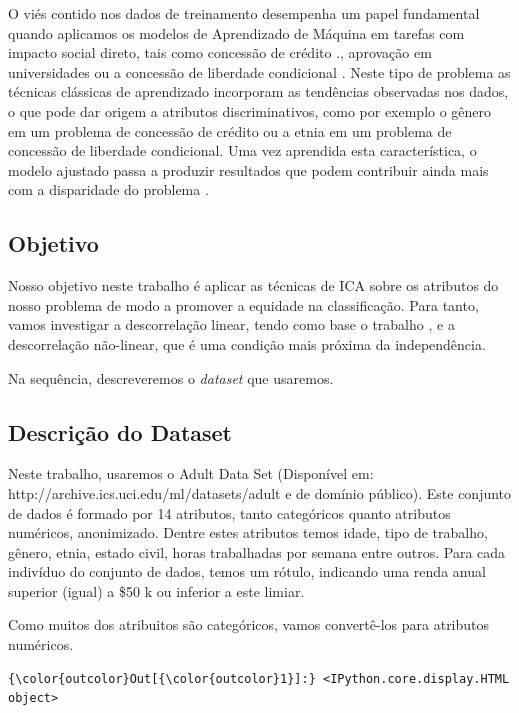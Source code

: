 \documentclass[11pt]{article}
\begin{document}
O viés contido nos dados de treinamento desempenha um papel fundamental
quando aplicamos os modelos de Aprendizado de Máquina em tarefas com
impacto social direto, tais como concessão de crédito \cite{ONeil2016}.,
aprovação em universidades \cite{ONeil2016} ou a concessão de liberdade
condicional \cite{Chouldechova2017}. Neste tipo de problema as técnicas
clássicas de aprendizado incorporam as tendências observadas nos dados,
o que pode dar origem a atributos discriminativos, como por exemplo o
gênero em um problema de concessão de crédito ou a etnia em um problema
de concessão de liberdade condicional. Uma vez aprendida esta
característica, o modelo ajustado passa a produzir resultados que podem
contribuir ainda mais com a disparidade do problema \cite{ONeil2016}.

    \subsection{Objetivo}\label{objetivo}

Nosso objetivo neste trabalho é aplicar as técnicas de ICA
\cite{Hyvarinen2001} sobre os atributos do nosso problema de modo a
promover a equidade na classificação. Para tanto, vamos investigar a
descorrelação linear, tendo como base o trabalho \cite{Zafar2017}, e a
descorrelação não-linear, que é uma condição mais próxima da
independência.

Na sequência, descreveremos o \emph{dataset} que usaremos.

    \subsection{Descrição do Dataset}\label{descriuxe7uxe3o-do-dataset}

Neste trabalho, usaremos o Adult Data Set (Disponível em:
http://archive.ics.uci.edu/ml/datasets/adult e de domínio público). Este
conjunto de dados é formado por 14 atributos, tanto categóricos quanto
atributos numéricos, anonimizado. Dentre estes atributos temos idade,
tipo de trabalho, gênero, etnia, estado civil, horas trabalhadas por
semana entre outros. Para cada indivíduo do conjunto de dados, temos um
rótulo, indicando uma renda anual superior (igual) a \$50 k ou inferior
a este limiar.

Como muitos dos atribuitos são categóricos, vamos convertê-los para
atributos numéricos.

\begin{Verbatim}[commandchars=\\\{\}]
{\color{outcolor}Out[{\color{outcolor}1}]:} <IPython.core.display.HTML object>
\end{Verbatim}
            
\end{document}
